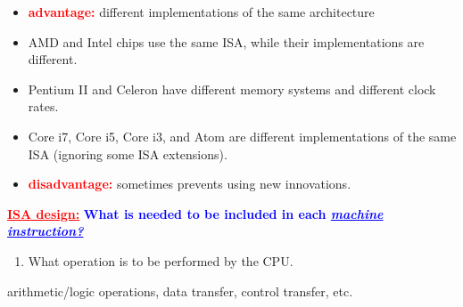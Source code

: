 \documentclass[
  14pt,
  a4paper,
  DIV=11,
  numbers=noendperiod,
  headinclude=true,
  footinclude=true]{scrreprt}
\providecommand{\tightlist}{%
  \setlength{\itemsep}{0pt}\setlength{\parskip}{0pt}}\usepackage{longtable,booktabs,array}
\begin{document}
\begin{tcolorbox}[colback=boxbodycol, colframe=boxheadcol, title=Issues with a fixed ISA:, coltitle=boxtitlecol, colbacktitle=boxheadcol]

\begin{itemize}
\tightlist
\item
  \textcolor{red}{\textbf{advantage:}} different implementations of the
  same architecture
\end{itemize}

\begin{tcolorbox}[oversize, left=11pt, right=11pt, colback=boxbodycol2, colframe=boxheadcol2, title=Example, coltitle=boxtitlecol2, colbacktitle=boxheadcol2]

\begin{itemize}
\tightlist
\item
  AMD and Intel chips use the same ISA, while their implementations are
  different.
\item
  Pentium II and Celeron have different memory systems and different
  clock rates.
\item
  Core i7, Core i5, Core i3, and Atom are different implementations of
  the same ISA (ignoring some ISA extensions).
\end{itemize}

\end{tcolorbox}

\begin{itemize}
\tightlist
\item
  \textcolor{red}{\textbf{disadvantage:}} sometimes prevents using new
  innovations.
\end{itemize}

\end{tcolorbox}

\textcolor{red}{\textbf{\underline{ISA design:}}}
\textcolor{blue}{\textbf{What is needed to be included in each \textit{\underline{machine instruction?}}}}

\begin{enumerate}
\def\labelenumi{\arabic{enumi}.}
\tightlist
\item
  What operation is to be performed by the CPU.
\end{enumerate}

\begin{tcolorbox}[colback=boxbodycol, colframe=boxbodycol]
arithmetic/logic operations, data transfer, control transfer, etc.

\end{tcolorbox}
\end{document}
